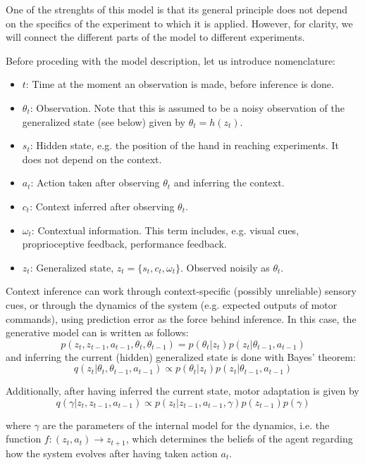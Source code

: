\documentclass[a4paper,doc,floatsintext,natbib]{apa6}
\begin{document}
One of the strenghts of this model is that its general principle does not
depend on the specifics of the experiment to which it is applied. However, for
clarity, we will connect the different parts of the model to different
experiments.

Before proceding with the model description, let us introduce nomenclature:
\begin{itemize}
\item $t$: Time at the moment an observation is made, before inference is done.
\item $\theta_t$: Observation. Note that this is assumed to be a noisy
observation of the generalized state (see below) given by $\theta_t = h(z_t)$.
\item $s_t$: Hidden state, e.g. the position of the hand in reaching
experiments. It does not depend on the context.
\item $a_t$: Action taken after observing $\theta_t$ and inferring the context.
\item $c_t$: Context inferred after observing $\theta_t$.
\item $\omega_t$: Contextual information. This term includes, e.g. visual cues,
proprioceptive feedback, performance feedback.
\item $z_t$: Generalized state, $z_t = \{s_t, c_t, \omega_t\}$. Observed noisily
as $\theta_t$.
\end{itemize}

Context inference can work through context-specific (possibly unreliable) sensory cues,
or through the dynamics of the system (e.g. expected outputs of motor
commands), using prediction error as the force behind inference. In this case,
the generative model can is written as follows:
\[
p(z_t, z_{t-1}, a_{t-1}, \theta_t, \theta_{t-1}) = p(\theta_t | z_t)p(z_t|\theta_{t-1}, a_{t-1})
\]
and inferring the current (hidden) generalized state is done with Bayes' theorem:
\[
  q(z_t | \theta_t, \theta_{t-1}, a_{t-1}) \propto p(\theta_t | z_t)p(z_t|\theta_{t-1}, a_{t-1})
\]
  
Additionally, after having inferred the current state, motor adaptation is given by
\[
q(\gamma | z_t, z_{t-1}, a_{t-1}) \propto p(z_t | z_{t-1}, a_{t-1}, \gamma)p(z_{t-1})p(\gamma)
\]

where $\gamma$ are the parameters of the internal model for the dynamics,
i.e. the function $f: (z_t, a_t) \rightarrow z_{t+1}$, which determines the beliefs of
the agent regarding how the system evolves after having taken action $a_t$.
\end{document}
